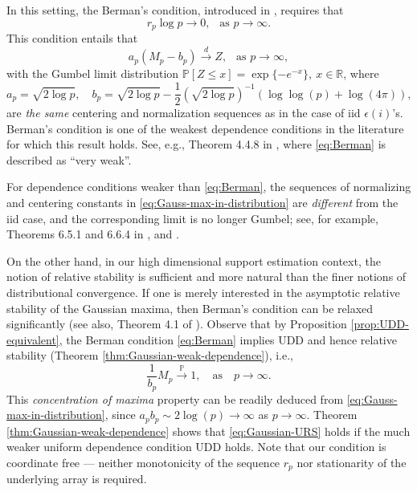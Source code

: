 In this setting, the Berman's condition, introduced in \cite{berman1964limit}, requires that
\begin{equation} \label{eq:Berman}
    r_p \log p \to 0,\ \ \mbox{ as }p\to\infty.
\end{equation}
This condition entails that 
\begin{equation}
    \label{eq:Gauss-max-in-distribution}
  a_p (M_p - b_p) \stackrel{d}{\longrightarrow } Z,\  \ \mbox{ as }p\to\infty,
\end{equation}
with the Gumbel limit distribution $\mathbb P [Z\le x] = \exp\{-e^{-x}\},\ x\in \mathbb R$, 
where 
$$
a_p = \sqrt{2\log p},\quad b_p  = \sqrt{2\log p} - \frac{1}{2}\left(\sqrt{2\log p}\right)^{-1}\left(\log \log (p) + \log(4\pi)\right),
$$ 
are {\em the same} centering and normalization sequences
as in the case of iid $\epsilon(i)$'s.  
Berman's condition is one of the weakest dependence conditions  in the literature for which this result holds. See, e.g., Theorem 4.4.8 in \cite{embrechts2013modelling}, where \eqref{eq:Berman} is described as ``very weak''.

For dependence conditions weaker than \eqref{eq:Berman}, the sequences of normalizing and centering constants in \eqref{eq:Gauss-max-in-distribution} are {\em different} from the iid case, and the corresponding limit is no longer Gumbel; see, for example, Theorems 6.5.1 and  6.6.4 in \cite{leadbetter2012extremes}, and \cite{mccormick1976weak}. 

On the other hand, in our high dimensional support estimation context, the notion of relative stability is sufficient and more natural than the finer notions of distributional convergence.
If one is merely interested in the asymptotic relative stability of the Gaussian maxima, then Berman's condition can be relaxed significantly (see also, Theorem 4.1 of \cite{berman1964limit}). 
Observe that by Proposition \ref{prop:UDD-equivalent},  the Berman condition \eqref{eq:Berman} implies UDD and hence relative stability (Theorem \ref{thm:Gaussian-weak-dependence}), i.e., 
\begin{equation} \label{eq:Gaussian-URS}
  \frac{1}{b_p} M_p \stackrel{\mathbb P}{\to} 1,\quad\mbox{as}\quad p\to\infty.
\end{equation}
This {\em concentration of maxima} property can be readily deduced from \eqref{eq:Gauss-max-in-distribution}, since $a_p b_p \sim 2\log(p) \to \infty$ as $p\to\infty$.
Theorem \ref{thm:Gaussian-weak-dependence} shows that \eqref{eq:Gaussian-URS} holds if the much weaker uniform dependence condition UDD holds. 
Note that our condition is coordinate free --- neither monotonicity of the sequence $r_p$ nor stationarity of the underlying array is required. 

